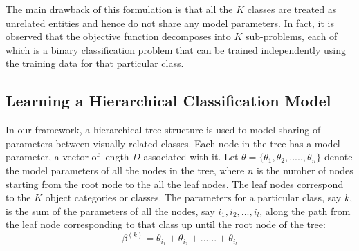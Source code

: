 \documentclass[10pt,twocolumn,letterpaper]{article}
\begin{document}
 The main drawback of this formulation is that all the $K$ classes are treated as unrelated entities and hence 
 do not share any model parameters. In fact, it is observed that the objective function decomposes into 
 $K$ sub-problems, each of which is a binary classification problem that can be trained independently 
 using the training data for that particular class.
 
 
 \subsection{Learning a Hierarchical Classification Model}
 In our framework, a hierarchical tree structure is used to model sharing of parameters between 
 visually related classes. Each node in the tree has a model parameter, a vector of length $D$ 
 associated with it.  Let $ \theta = \{ \theta_{1}, \theta_{2},.....,\theta_{n}\} $ denote the model parameters 
 of all the nodes in the tree, where $n$ is the number of nodes starting from the root node to the all the leaf nodes.
 The leaf nodes correspond to the $K$ object categories or classes. The parameters for a particular class, say $k$,
 is the sum of the parameters of all the nodes, say $i_{1}, i_{2}, ..., i_{l} $, along the path from the leaf node
 corresponding to that class up until the root node of the tree:
 \begin{equation}
 \beta^{(k)} = \theta_{i_{1}} +  \theta_{i_{2}} + ...... + \theta_{i_{l}}
  \end{equation} 
  
{\small


}
\end{document}

